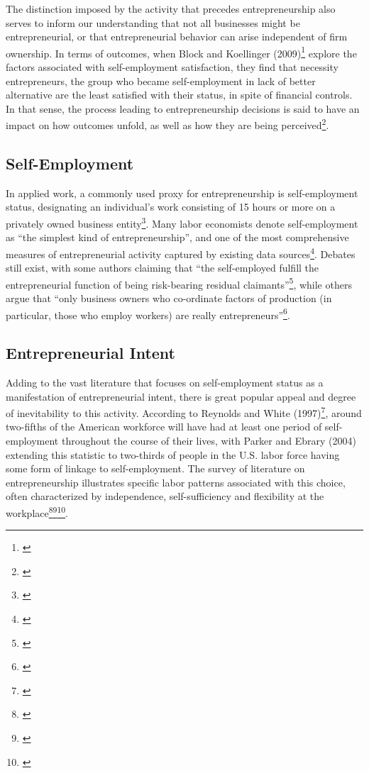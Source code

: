 The distinction imposed by the activity that precedes entrepreneurship also serves to inform our understanding that not all businesses might be entrepreneurial, or that entrepreneurial behavior can arise independent of firm ownership. In terms of outcomes, when Block and Koellinger (2009)\footnote{\cite{BlockKoellinger2009}} explore the factors associated with self-employment satisfaction, they find that necessity entrepreneurs, the group who became self-employment in lack of better alternative are the least satisfied with their status, in spite of financial controls. In that sense, the process leading to entrepreneurship decisions is said to have an impact on how outcomes unfold, as well as how they are being perceived\footnote{\cite{BlockKoellinger2009}}.

\subsection{Self-Employment}

In applied work, a commonly used proxy for entrepreneurship is self-employment status, designating an individual's work consisting of 15 hours or more on a privately owned business entity\footnote{\cite{BlanchflowerOswald1998}}. Many labor economists denote self-employment as ``the simplest kind of entrepreneurship'', and one of the most comprehensive measures of entrepreneurial activity captured by existing data sources\footnote{\cite{Parker2004}}. Debates still exist, with some authors claiming that ``the self-employed fulfill the entrepreneurial function of being risk-bearing residual claimants''\footnote{\cite[Page 5]{Parker2004}}, while others argue that ``only business owners who co-ordinate factors of production (in particular, those who employ workers) are really entrepreneurs''\footnote{\cite[Page 5]{Parker2004}}.

\subsection{Entrepreneurial Intent}

Adding to the vast literature that focuses on self-employment status as a manifestation of entrepreneurial intent, there is great popular appeal and degree of inevitability to this activity. According to Reynolds and White (1997)\footnote{\cite{ReynoldsWhite1997}}, around two-fifths of the American workforce will have had at least one period of self-employment throughout the course of their lives, with Parker and Ebrary (2004) extending this statistic to two-thirds of people in the U.S. labor force having some form of linkage to self-employment. The survey of literature on entrepreneurship illustrates specific labor patterns associated with this choice, often characterized by independence, self-sufficiency and flexibility at the workplace\footnote{\cite{RodrguezFierroGarridoNavarro2015}}\hspace{.15em}\footnote{\cite{Parker2004}}\hspace{.15em}\footnote{\cite{Quinn1980}}. 

